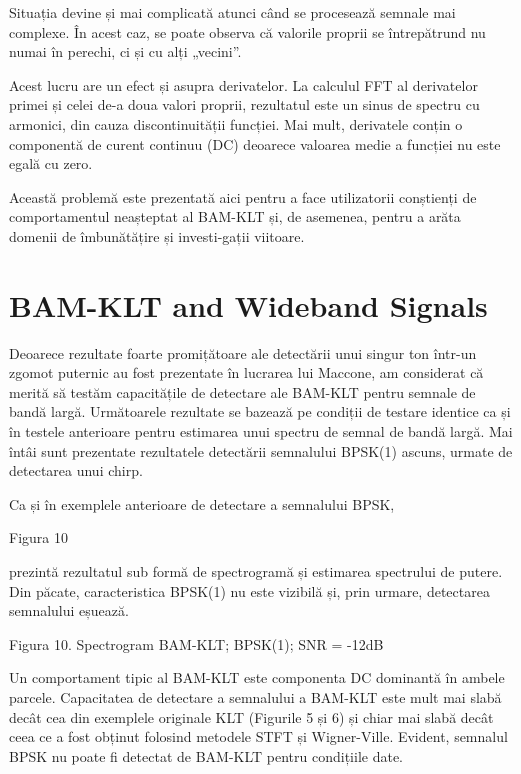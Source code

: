 \documentclass[12pt]{report}
\begin{document}
Situația devine și mai complicată atunci când se procesează semnale mai complexe. În acest caz, se poate observa că valorile proprii se întrepătrund nu numai în perechi, ci și cu alți „vecini”.

Acest lucru are un efect și asupra derivatelor. La calculul FFT al derivatelor primei și celei de-a doua valori proprii, rezultatul este un sinus de spectru cu armonici, din cauza discontinuității funcției. Mai mult, derivatele conțin o componentă de curent continuu (DC) deoarece valoarea medie a funcției nu este egală cu zero.

Această problemă este prezentată aici pentru a face utilizatorii conștienți de comportamentul neașteptat al BAM-KLT și, de asemenea, pentru a arăta domenii de îmbunătățire și investi-gații viitoare.

\section*{BAM-KLT and Wideband Signals}

Deoarece rezultate foarte promițătoare ale detectării unui singur ton într-un zgomot puternic au fost prezentate în lucrarea lui Maccone, am considerat că merită să testăm capacitățile de detectare ale BAM-KLT pentru semnale de bandă largă. Următoarele rezultate se bazează pe condiții de testare identice ca și în testele anterioare pentru estimarea unui spectru de semnal de bandă largă. Mai întâi sunt prezentate rezultatele detectării semnalului BPSK(1) ascuns, urmate de detectarea unui chirp.

Ca și în exemplele anterioare de detectare a semnalului BPSK, \begin{normalsize}\color{red}Figura 10\end{normalsize} prezintă rezultatul sub formă de spectrogramă și estimarea spectrului de putere. Din păcate, caracteristica BPSK(1) nu este vizibilă și, prin urmare, detectarea semnalului eșuează.
\begin{center}
	\color{blue}Figura 10. Spectrogram BAM-KLT; BPSK(1); SNR = -12dB
\end{center}
Un comportament tipic al BAM-KLT este componenta DC dominantă în ambele parcele. Capacitatea de detectare a semnalului a BAM-KLT este mult mai slabă decât cea din exemplele originale KLT (Figurile 5 și 6) și chiar mai slabă decât ceea ce a fost obținut folosind metodele STFT și Wigner-Ville. Evident, semnalul BPSK nu poate fi detectat de BAM-KLT pentru condițiile date.
\end{document}

